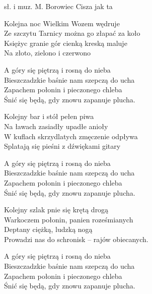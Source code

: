 {sł. i muz. M. Borowiec}
{Cisza jak ta}
\begin{text}

Kolejna noc Wielkim Wozem wędruje\\
Ze szczytu Tarnicy można go złapać za koło\\
Księżyc granie gór cienką kreską maluje\\
Na złoto, zielono i czerwono

\vin A góry się piętrzą i rosną do nieba\\
\vin Bieszczadzkie baśnie nam szepczą do ucha\\
\vin Zapachem połonin i pieczonego chleba\\
\vin Śnić się będą, gdy znowu zapanuje plucha.

Kolejny bar i stół pełen piwa\\
Na ławach zasiadły upadłe anioły\\
W kuflach skrzydlatych zmęczenie odpływa\\
Splatają się pieśni z dźwiękami gitary

\vin A góry się piętrzą i rosną do nieba\\
\vin Bieszczadzkie baśnie nam szepczą do ucha\\
\vin Zapachem połonin i pieczonego chleba\\
\vin Śnić się będą, gdy znowu zapanuje plucha.

\hfill\break
Kolejny szlak pnie się krętą drogą\\
Warkoczem połonin, panien roześmianych\\
Deptany ciężką, ludzką nogą\\
Prowadzi nas do schronisk – rajów obiecanych.

\vin A góry się piętrzą i rosną do nieba\\
\vin Bieszczadzkie baśnie nam szepczą do ucha\\
\vin Zapachem połonin i pieczonego chleba\\
\vin Śnić się będą, gdy znowu zapanuje plucha.

\end{text}
